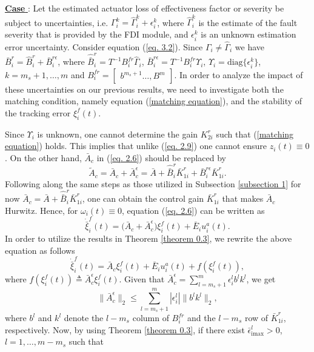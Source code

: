 \documentclass[12pt,draftcls,onecolumn]{IEEEtran}
\newcommand{\RNum}[1]{\uppercase\expandafter{\romannumeral #1\relax}}
\begin{document}
\underline{\textbf{Case \RNum{4}}}: Let the estimated  actuator loss of effectiveness factor or severity be subject to uncertainties, i.e. $\Gamma_i^k=\hat\Gamma_i^k+\epsilon_i^k$, where $\hat\Gamma_i^k$ is the estimate of the fault severity that is provided by the FDI module, and $\epsilon_i^k$ is an unknown estimation error uncertainty. 
Consider equation (\ref{eq. 3.2}). Since $\Gamma_i\ne \hat{\Gamma}_i$ we have $\bar B_i^r=\hat B_i^r+\bar B_i^{r\epsilon}$, where 
$\hat{\bar B}_i^r=T^{-1}B_i^{fr}\hat{\Gamma}_i$,  $\bar{B}_i^{r\epsilon}=T^{-1}B_i^{fr}\Upsilon_i$,  $\Upsilon_i=\text{diag}\{\epsilon_i^k\}$, $k=m_{s}+1,\dots,m$ and $B_i^{fr}=\begin{bmatrix}b^{m_{s}+1}\dots,B^{m}\end{bmatrix}$. 
In order to analyze the impact of these uncertainties on our previous results, we need to investigate both the matching condition, namely equation (\ref{matching equation}), and the stability of the tracking error $\xi_i^f(t)$. \par
Since $\Upsilon_i$ is unknown, one cannot determine the gain $K_{2i}^r$ such that (\ref{matching equation}) holds. This implies that unlike (\ref{eq. 2.9}) one cannot ensure $z_i(t)\equiv0$.  
On the other hand, $\bar{A}_c$ in  (\ref{eq. 2.6}) should be replaced by
$$
\tilde{A}_c={\bar A}_c+ \bar A_c^{\epsilon}=\bar A+\hat{\bar B}_i^r \bar{K}_{1i}^r+\bar{B}_i^{r\epsilon} \bar K_{1i}^r.
$$
Following along the same steps as those utilized in Subsection \ref{subsection 1} for now  $\bar A_c=\bar A+\hat{\bar B}_i^r \bar{K}_{1i}^r$, one can obtain the control gain $\bar{K}_{1i}^r$ that makes $\bar{A}_c$ Hurwitz. Hence, for $\omega_i(t)\equiv 0$, equation (\ref{eq. 2.6}) can be written as
$$\dot{\bar{\xi}}_i^f(t)=\big(\bar A_c +\bar A_c^{\epsilon} \big)\xi_i^f(t)+\bar E_iu_i^a(t).$$
In order to utilize the results in Theorem \ref{theorem 0.3}, we rewrite the above equation as follows
$$
\dot{\bar{\xi}}_i^f(t)=\bar A_c \xi_i^f(t)+\bar E_iu_i^a(t)+f(\xi_i^f(t)),
$$
where $f(\xi_i^f(t))\triangleq\bar A_c^{\epsilon} \xi_i^f(t)$. Given that $\bar A_c^{\epsilon}=\sum_{l=m_s+1}^m\epsilon_i^lb^lk^{l}$, we get
\begin{equation*}
\| \bar A_c^{\epsilon}\|_2\leq \sum_{l=m_s+1}^{m}|\epsilon_i^l|  \|b^lk^{l}\|_2,
\end{equation*}
where $b^l$ and $k^l$ denote the   $l-m_s$ column of $B_i^{fr}$ and the $l-m_s$  row  of $\bar K_{1i}^r$, respectively. Now, by using Theorem \ref{theorem 0.3}, if there exist $ \bar{\epsilon}_{\text{imax}}^l>0$, $l=1,\dots,m-m_s$ such that
\end{document}
